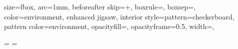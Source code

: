 
{
	size=fbox,
	arc=1mm,
	beforeafter skip=\fboxrule+\tabcolsep,
	boxrule=\fboxrule,
	boxsep=\tabcolsep,
	color=environment,
	enhanced jigsaw,
	interior style={pattern=checkerboard, pattern color=environment},
	opacityfill=\@opacity,
	opacityframe=0.5,
	width=\hsize,
}
\appto\structure{\disable@lines}

\renewcommand{\hypcapspace}{\baselineskip}

\newlength\@default@parindent
\newlength\@default@parskip

\AtBeginDocument
{
	\@default@parindent=\parindent
	\@default@parskip=\parskip
}

\newcommand\StyleEnvironment[1]
{
	\csappto{#1}
	{
		\Kayhan
		\parindent=\@default@parindent
		\parskip=\@default@parskip
		\enable@lines
		\capstart
		\let\word\wordtext
	}
	\cspreto{#1}{\colorlet{environment}{#1}}
	\cspreto{end#1}
	{
		\WriteFootnotes
		\let\word\@original@word
		\disable@lines
	}
}

\newcommand{\FloatEnvironment}[2]
{
	\renewenvironment{#1}
	{
		\captionsetup{type=#1}
		\begin{tcolorbox}[floats, color=environment]
	}
	{
		\end{tcolorbox}
	}
	\renewenvironment{#1*}
	{
		\captionsetup{type=#1}
		\begin{tcolorbox}[floats, float*, width=\textwidth, color=environment]
	}
	{
		\end{tcolorbox}
	}
	\StyleEnvironment{#1}
	\StyleEnvironment{#1*}
}

\newcommand{\InlineEnvironment}[2]
{
	\renewenvironment{#1}
	{
		\captionsetup{type=#1}
		\begin{tcolorbox}[inline, color=environment]
	}
	{
		\end{tcolorbox}
	}
	\StyleEnvironment{#1}
	\StyleEnvironment{#1*}
}

\newcommand{\NewEnvironment}[4][]
{
	\newfloat{#2}{b}{#2}[chapter]
	\listadd{\Environments}{#2}
	\definecolor{#2}{RGB}{#4}
	\colorlet{#2*}{#2}
	
	\IfSubStr{#1}{Inline}
		{\InlineEnvironment{#2}}
		{\FloatEnvironment{#2}}

	\expandafter\let\csname
	l@#2\endcsname\l@figure

	\Name{#2}{#3}{#2}
	\Name{list#2}{فهرست #3‌ها}{#2}
	\floatname{#2}{\csname#2name\endcsname}

	\cspreto{#2}{\write\@mainaux{\listxadd{\string\UsedEnvironment}{#2}}}
	\cspreto{#2*}{\write\@mainaux{\listxadd{\string\UsedEnvironment}{#2}}}

	\IfSubStr{#1}{No List}
	{}
	{
		\AtBeginDocument
		{
			\ifinlist{#2}{\UsedEnvironment}
			{\appto\@otherlists{\printlistof{#2}}}
			{}
		}
	}
}

